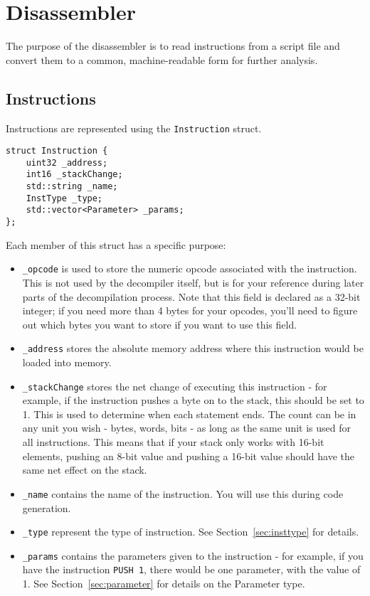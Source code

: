 \section{Disassembler}

The purpose of the disassembler is to read instructions from a script file and convert them to a common, machine-readable form for further analysis.

\subsection{Instructions}
Instructions are represented using the \verb+Instruction+ struct.

\begin{C++}
\begin{lstlisting}
struct Instruction {
	uint32 _address;
	int16 _stackChange;
	std::string _name;
	InstType _type;
	std::vector<Parameter> _params;
};
\end{lstlisting}
\end{C++}

Each member of this struct has a specific purpose:
\begin{itemize}
\item \verb+_opcode+ is used to store the numeric opcode associated with the instruction. This is not used by the decompiler itself, but is for your reference during later parts of the decompilation process. Note that this field is declared as a 32-bit integer; if you need more than 4 bytes for your opcodes, you'll need to figure out which bytes you want to store if you want to use this field.
\item \verb+_address+ stores the absolute memory address where this instruction would be loaded into memory.
\item \verb+_stackChange+ stores the net change of executing this instruction - for example, if the instruction pushes a byte on to the stack, this should be set to 1. This is used to determine when each statement ends. The count can be in any unit you wish - bytes, words, bits - as long as the same unit is used for all instructions. This means that if your stack only works with 16-bit elements, pushing an 8-bit value and pushing a 16-bit value should have the same net effect on the stack.
\item \verb+_name+ contains the name of the instruction. You will use this during code generation.
\item \verb+_type+ represent the type of instruction. See Section~\vref{sec:insttype} for details.
\item \verb+_params+ contains the parameters given to the instruction - for example, if you have the instruction \verb+PUSH 1+, there would be one parameter, with the value of 1. See Section~\vref{sec:parameter} for details on the Parameter type.
\end{itemize}

